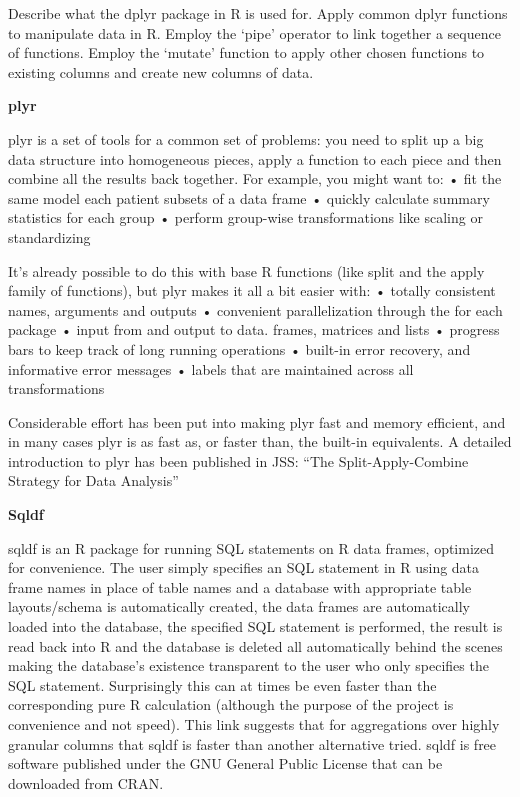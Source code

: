 \documentclass[12pt,openany]{book}
\begin{document}
Describe what the dplyr package in R is used for. Apply common dplyr functions to manipulate data in R. Employ the `pipe' operator to link together a sequence of functions. Employ the `mutate' function to apply other chosen functions to existing columns and create new columns of data.

\textbf{plyr}

plyr is a set of tools for a common set of problems: you need to split up a big data structure into homogeneous pieces, apply a function to each piece and then combine all the results back together. For example, you might want to:
• fit the same model each patient subsets of a data frame
• quickly calculate summary statistics for each group
• perform group-wise transformations like scaling or standardizing

It's already possible to do this with base R functions (like split and the apply family of functions), but plyr makes it all a bit easier with:
• totally consistent names, arguments and outputs
• convenient parallelization through the for each package
• input from and output to data. frames, matrices and lists
• progress bars to keep track of long running operations
• built-in error recovery, and informative error messages
• labels that are maintained across all transformations

Considerable effort has been put into making plyr fast and memory efficient, and in many cases plyr is as fast as, or faster than, the built-in equivalents.
A detailed introduction to plyr has been published in JSS: ``The Split-Apply-Combine Strategy for Data Analysis''

\textbf{Sqldf}

sqldf is an R package for running SQL statements on R data frames, optimized for convenience. The user simply specifies an SQL statement in R using data frame names in place of table names and a database with appropriate table layouts/schema is automatically created, the data frames are automatically loaded into the database, the specified SQL statement is performed, the result is read back into R and the database is deleted all automatically behind the scenes making the database's existence transparent to the user who only specifies the SQL statement. Surprisingly this can at times be even faster than the corresponding pure R calculation (although the purpose of the project is convenience and not speed). This link suggests that for aggregations over highly granular columns that sqldf is faster than another alternative tried. sqldf is free software published under the GNU General Public License that can be downloaded from CRAN.
\end{document}
